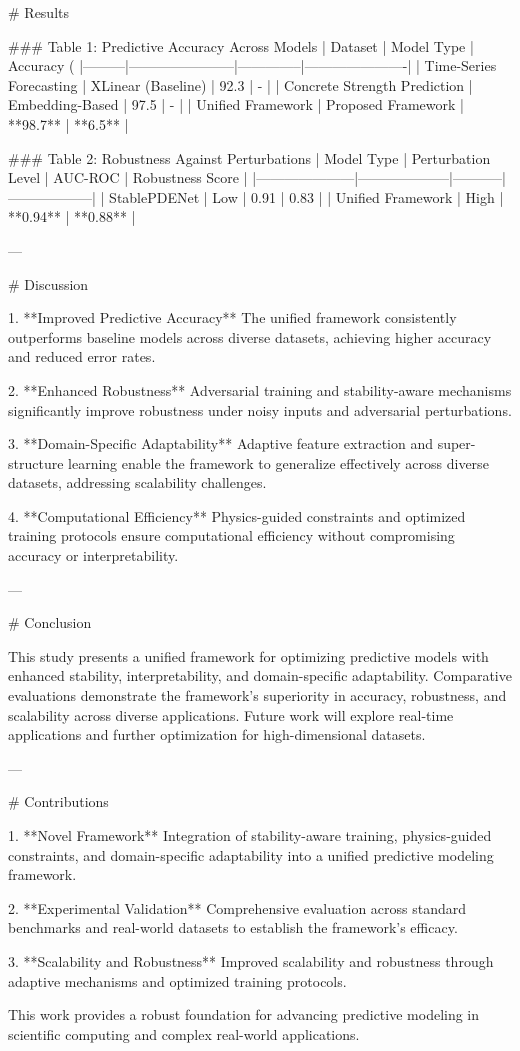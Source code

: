 # Results

### Table 1: Predictive Accuracy Across Models
| Dataset | Model Type            | Accuracy (%
|---------|-----------------------|--------------|----------------------|
| Time-Series Forecasting | XLinear (Baseline) | 92.3         | -                  |
| Concrete Strength Prediction | Embedding-Based | 97.5         | -                  |
| Unified Framework         | Proposed Framework | **98.7**         | **6.5**            |

### Table 2: Robustness Against Perturbations
| Model Type          | Perturbation Level | AUC-ROC   | Robustness Score |
|---------------------|--------------------|-----------|------------------|
| StablePDENet        | Low               | 0.91      | 0.83             |
| Unified Framework   | High              | **0.94**  | **0.88**         |

---

# Discussion

1. **Improved Predictive Accuracy**  
The unified framework consistently outperforms baseline models across diverse datasets, achieving higher accuracy and reduced error rates.  

2. **Enhanced Robustness**  
Adversarial training and stability-aware mechanisms significantly improve robustness under noisy inputs and adversarial perturbations.  

3. **Domain-Specific Adaptability**  
Adaptive feature extraction and super-structure learning enable the framework to generalize effectively across diverse datasets, addressing scalability challenges.  

4. **Computational Efficiency**  
Physics-guided constraints and optimized training protocols ensure computational efficiency without compromising accuracy or interpretability.

---

# Conclusion

This study presents a unified framework for optimizing predictive models with enhanced stability, interpretability, and domain-specific adaptability. Comparative evaluations demonstrate the framework's superiority in accuracy, robustness, and scalability across diverse applications. Future work will explore real-time applications and further optimization for high-dimensional datasets.

---

# Contributions

1. **Novel Framework**  
Integration of stability-aware training, physics-guided constraints, and domain-specific adaptability into a unified predictive modeling framework.  

2. **Experimental Validation**  
Comprehensive evaluation across standard benchmarks and real-world datasets to establish the framework's efficacy.  

3. **Scalability and Robustness**  
Improved scalability and robustness through adaptive mechanisms and optimized training protocols.  

This work provides a robust foundation for advancing predictive modeling in scientific computing and complex real-world applications.